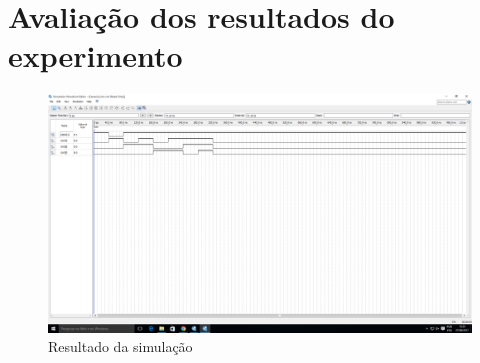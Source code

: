 \chapter{Avaliação dos resultados do experimento}


\begin{figure}[htb]
    \centering
	\caption{\label{fig:printSimulacao}Resultado da simulação}
	\includegraphics[width=1\textwidth]{img/cenario2/printSimulacao}
\end{figure}

